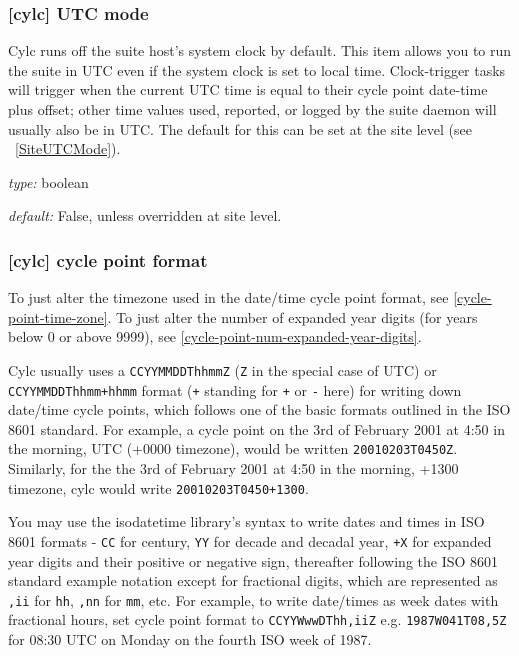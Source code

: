 \subsubsection[UTC mode]{ [cylc] \textrightarrow UTC mode}
\label{UTC-mode}

Cylc runs off the suite host's system clock by default. This item allows
you to run the suite in UTC even if the system clock is set to local time.
Clock-trigger tasks will trigger when the current UTC time is equal to
their cycle point date-time plus offset; other time values used, reported,
or logged by the suite daemon will usually also be in UTC. The default for
this can be set at the site level (see ~\ref{SiteUTCMode}).

\begin{myitemize}
    \item {\em type:} boolean
    \item {\em default:} False, unless overridden at site level.
\end{myitemize}

\subsubsection[cycle point format]{ [cylc] \textrightarrow cycle point format}
\label{cycle-point-format}

To just alter the timezone used in the date/time cycle point format, see
\ref{cycle-point-time-zone}. To just alter the number of expanded year digits
(for years below 0 or above 9999), see
\ref{cycle-point-num-expanded-year-digits}.

Cylc usually uses a \lstinline=CCYYMMDDThhmmZ= (\lstinline=Z= in the special
case of UTC) or \lstinline=CCYYMMDDThhmm+hhmm= format (\lstinline=+= standing
for \lstinline=+= or \lstinline=-= here) for writing down date/time cycle
points, which follows one of the basic formats outlined in the ISO 8601
standard. For example, a cycle point on the 3rd of February 2001 at 4:50 in
the morning, UTC (+0000 timezone), would be written
\lstinline=20010203T0450Z=. Similarly, for the the 3rd of February 2001 at
4:50 in the morning, +1300 timezone, cylc would write
\lstinline=20010203T0450+1300=.

You may use the isodatetime library's syntax to write dates and times in ISO
8601 formats - \lstinline=CC= for century, \lstinline=YY= for decade and
decadal year, \lstinline=+X= for expanded year digits and their positive or
negative sign, thereafter following the ISO 8601 standard example notation
except for fractional digits, which are represented as \lstinline=,ii= for
\lstinline=hh=, \lstinline=,nn= for \lstinline=mm=, etc. For example, to write
date/times as week dates with fractional hours, set cycle point format to
\lstinline=CCYYWwwDThh,iiZ= e.g. \lstinline=1987W041T08,5Z= for 08:30 UTC on
Monday on the fourth ISO week of 1987.

